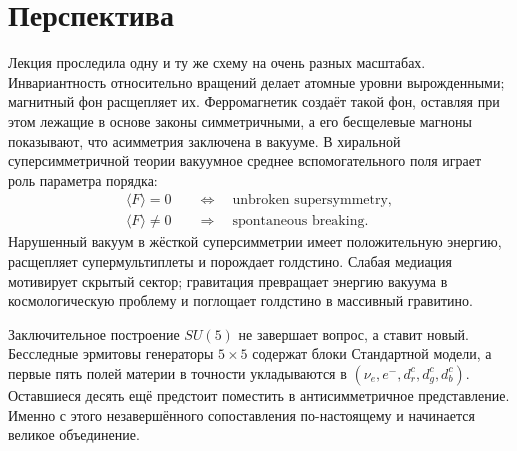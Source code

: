 \begin{classroomqa}
\end{classroomqa}

\section{Перспектива}

Лекция проследила одну и ту же схему на очень разных масштабах. Инвариантность относительно вращений делает атомные уровни вырожденными; магнитный фон расщепляет их. Ферромагнетик создаёт такой фон, оставляя при этом лежащие в основе законы симметричными, а его бесщелевые магноны показывают, что асимметрия заключена в вакууме. В хиральной суперсимметричной теории вакуумное среднее вспомогательного поля играет роль параметра порядка:
\begin{equation}
\begin{aligned}
\langle F\rangle=0
&\quad\Longleftrightarrow\quad
\text{unbroken supersymmetry},\\
\langle F\rangle\neq0
&\quad\Longrightarrow\quad
\text{spontaneous breaking}.
\end{aligned}
\end{equation}
Нарушенный вакуум в жёсткой суперсимметрии имеет положительную энергию, расщепляет супермультиплеты и порождает голдстино. Слабая медиация мотивирует скрытый сектор; гравитация превращает энергию вакуума в космологическую проблему и поглощает голдстино в массивный гравитино.

Заключительное построение \(SU(5)\) не завершает вопрос, а ставит новый. Бесследные эрмитовы генераторы \(5\times5\) содержат блоки Стандартной модели, а первые пять полей материи в точности укладываются в \((\nu_e,e^-,d^c_r,d^c_g,d^c_b)\). Оставшиеся десять ещё предстоит поместить в антисимметричное представление. Именно с этого незавершённого сопоставления по-настоящему и начинается великое объединение.

